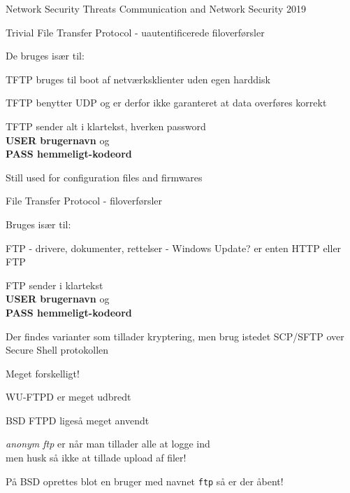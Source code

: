 \documentclass[Screen16to9,17pt,footrule]{foils}
\begin{document}
\mytitlepage
{Network Security Threats}
{Communication and Network Security 2019}




\begin{list1}
\item Trivial File Transfer Protocol - uautentificerede filoverførsler
\item De bruges især til:
  \begin{list2}
\item TFTP bruges til boot af netværksklienter uden egen harddisk
\item TFTP benytter UDP og er derfor ikke garanteret at data overføres korrekt
  \end{list2}
\item TFTP sender alt i klartekst, hverken password \\
{\bfseries USER brugernavn} og \\
{\bfseries PASS hemmeligt-kodeord}
\end{list1}
Still used for configuration files and firmwares


\begin{list1}
\item File Transfer Protocol - filoverførsler
\item Bruges især til:
  \begin{list2}
    \item FTP - drivere, dokumenter, rettelser - Windows Update? er
    enten HTTP eller FTP
  \end{list2}
\item FTP sender i klartekst\\
{\bfseries USER brugernavn} og \\
{\bfseries PASS hemmeligt-kodeord}
\item Der findes varianter som tillader kryptering, men brug istedet SCP/SFTP over Secure Shell protokollen
\end{list1}



\begin{list1}
\item Meget forskelligt!
\item WU-FTPD er meget udbredt
\item BSD FTPD ligeså meget anvendt
\item \emph{anonym ftp} er når man tillader alle at logge ind\\
men husk så ikke at tillade upload af filer!
\item På BSD oprettes blot en bruger med navnet \verb+ftp+ så er der åbent!
\end{list1}
\end{document}

